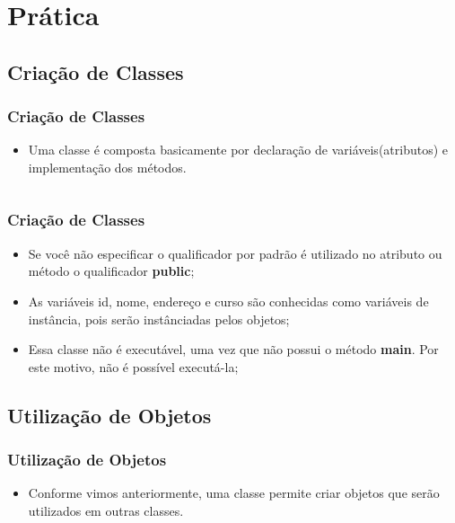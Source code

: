 \documentclass{beamer}
\begin{document}
\section{Prática}

\subsection{Criação de Classes}
\begin{frame}
	\frametitle{Criação de Classes}
	\begin{itemize}
		\item Uma classe é composta basicamente por declaração de variáveis(atributos) e implementação dos métodos.
	\end{itemize}
	\inputminted{java}{codigos/Aluno.java}
\end{frame}
\begin{frame}
	\frametitle{Criação de Classes}
	\begin{itemize}
		\item Se você não especificar o qualificador por padrão é utilizado no atributo ou método o qualificador \textbf{public};
		\item As variáveis id, nome, endereço e curso são conhecidas como variáveis de instância, pois serão instânciadas pelos objetos;
		\item Essa classe não é executável, uma vez que não possui o método \textbf{main}. Por este motivo, não é possível executá-la;
	\end{itemize}
\end{frame}

\subsection{Utilização de Objetos}
\begin{frame}
	\frametitle{Utilização de Objetos}
	\begin{itemize}
		\item Conforme vimos anteriormente, uma classe permite criar objetos que serão utilizados em outras classes.
	\end{itemize}
	\inputminted{java}{codigos/Principal.java}
\end{frame}
\end{document}
